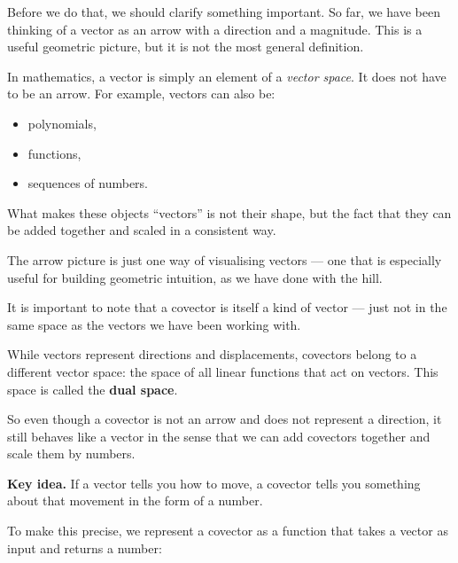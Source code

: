 \documentclass[11pt,openany]{book}
\theoremstyle{definition}
\begin{document}
\medskip

Before we do that, we should clarify something important. So far, we have been thinking 
of a vector as an arrow with a direction and a magnitude. This is a useful geometric picture, 
but it is not the most general definition.

\medskip

In mathematics, a vector is simply an element of a \textit{vector space}. It does not have 
to be an arrow. For example, vectors can also be:
\begin{itemize}
  \item polynomials,
  \item functions,
  \item sequences of numbers.
\end{itemize}

\medskip

What makes these objects ``vectors'' is not their shape, but the fact that they can be 
added together and scaled in a consistent way.

\medskip

The arrow picture is just one way of visualising vectors --- one that is especially useful 
for building geometric intuition, as we have done with the hill.

\medskip

\medskip

It is important to note that a covector is itself a kind of vector --- just not in the 
same space as the vectors we have been working with.

\medskip

While vectors represent directions and displacements, covectors belong to a different 
vector space: the space of all linear functions that act on vectors. This space is 
called the \textbf{dual space}.

\medskip

So even though a covector is not an arrow and does not represent a direction, it still 
behaves like a vector in the sense that we can add covectors together and scale them 
by numbers.

\medskip

\textbf{Key idea.} If a vector tells you how to move, a covector tells you something about that movement in the form of a number.

\medskip

To make this precise, we represent a covector as a function that takes a vector as input 
and returns a number:
\end{document}
